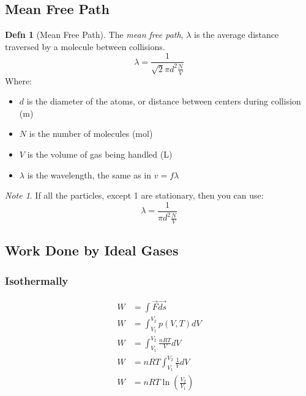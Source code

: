 \documentclass[10pt,letterpaper,final,twoside,notitlepage]{article}
\numberwithin{equation}{section} %
\theoremstyle{definition}
\newtheorem{definition}{Defn} %
\theoremstyle{remark}
\newtheorem{note}{Note}[definition] %
\begin{document}
	\subsection*{Mean Free Path} \label{subsec:Mean Free Path of Ideal Gas}
		\begin{definition}[Mean Free Path]
			The \emph{mean free path}, $\lambda$ is the average distance traversed by a molecule between collisions.
			\begin{equation} \label{eq:Mean Free Path of Ideal Gas}
				\lambda = \frac{1}{\sqrt{2} \pi d^{2} \frac{N}{V}}
			\end{equation}
			Where:
			\begin{itemize}[noitemsep, nolistsep]
				\item $d$ is the diameter of the atoms, or distance between centers during collision (\si{\meter})
				\item $N$ is the number of molecules (\si{\mole})
				\item $V$ is the volume of gas being handled (\si{\liter})
				\item $\lambda$ is the wavelength, the same as in $v=f\lambda$
			\end{itemize}
			\begin{note}
				If all the particles, except 1 are stationary, then you can use:
				\begin{equation} \label{eq:Mean Free Path of Stationary Ideal Gas}
					\lambda = \frac{1}{\pi d^{2} \frac{N}{V}}
				\end{equation}
			\end{note}
		\end{definition}
	
	\subsection*{Work Done by Ideal Gases} \label{subsec:Work Done By Ideal Gas}
		\subsubsection*{Isothermally} \label{subsubsec:Work Done Isothermally}
			\begin{equation}
				\begin{aligned}
					W &= \int \vec{F} \vec{ds} \\
					W &= \int_{V_{1}}^{V_{2}} p \left( V,T \right) dV \\
					W &= \int_{V_{1}}^{V_{2}} \frac{nRT}{V} dV \\
					W &= nRT \int_{V_{1}}^{V_{2}} \frac{1}{V} dV \\
					W &= nRT \ln \left( \frac{V_{2}}{V_{1}} \right) \\
				\end{aligned}
			\end{equation}
\end{document}
